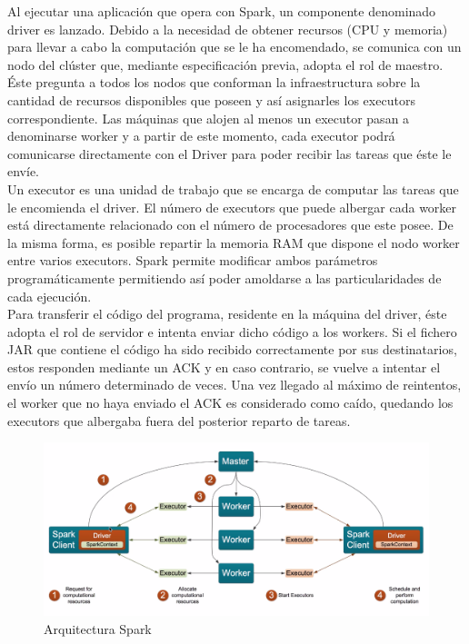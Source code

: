 Al ejecutar una aplicación que opera con Spark, un componente denominado driver es lanzado. Debido a la necesidad de obtener recursos (CPU y memoria) para llevar a cabo la computación que se le ha encomendado, se comunica con un nodo del clúster que, mediante especificación previa, adopta el rol de maestro. Éste pregunta a todos los nodos que conforman la infraestructura sobre la cantidad de recursos disponibles que poseen y así asignarles los executors correspondiente. Las máquinas que alojen al menos un executor pasan a denominarse worker y a partir de este momento, cada executor podrá comunicarse directamente con el Driver para poder recibir las tareas que éste le envíe.\\

Un executor es una unidad de trabajo que se encarga de computar las tareas que le encomienda el driver. El número de executors que puede albergar cada worker está directamente relacionado con el número de procesadores que este posee. De la misma forma, es posible repartir la memoria RAM que dispone el nodo worker entre varios executors. Spark permite modificar ambos parámetros programáticamente permitiendo así poder amoldarse a las particularidades de cada ejecución.\\

Para transferir el código del programa, residente en la máquina del driver, éste adopta  el rol de servidor e intenta enviar dicho código a los workers. Si el fichero JAR que contiene el código ha sido recibido correctamente por sus destinatarios, estos responden mediante un ACK y en caso contrario, se vuelve a intentar el envío un número determinado de veces. Una vez llegado al máximo de reintentos, el worker que no haya enviado el ACK es considerado como caído, quedando los executors que albergaba fuera del posterior reparto de tareas.\\

\begin{figure}[h]
	\centering
	\includegraphics[width=1\textwidth]{Ilustraciones/spark_architecture.png}
	\caption{Arquitectura Spark}
	\label{fig:spark_architecture}
\end{figure}

